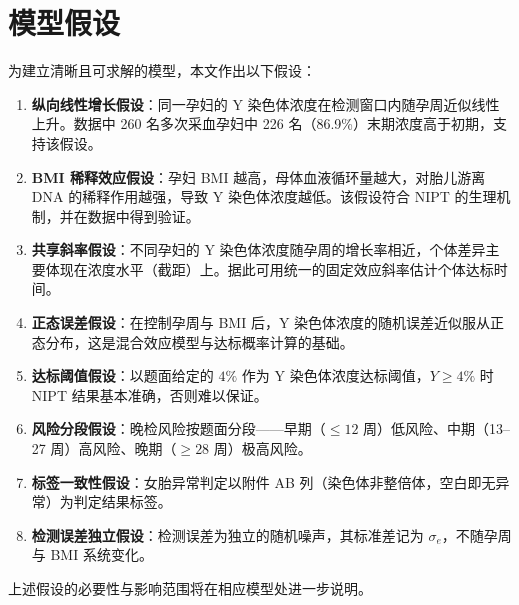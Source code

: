 \section{模型假设}

为建立清晰且可求解的模型，本文作出以下假设：

\begin{enumerate}
  \item \textbf{纵向线性增长假设}：同一孕妇的 Y 染色体浓度在检测窗口内随孕周近似线性上升。数据中 260 名多次采血孕妇中 226 名（86.9\%）末期浓度高于初期，支持该假设。
  \item \textbf{BMI 稀释效应假设}：孕妇 BMI 越高，母体血液循环量越大，对胎儿游离 DNA 的稀释作用越强，导致 Y 染色体浓度越低。该假设符合 NIPT 的生理机制，并在数据中得到验证。
  \item \textbf{共享斜率假设}：不同孕妇的 Y 染色体浓度随孕周的增长率相近，个体差异主要体现在浓度水平（截距）上。据此可用统一的固定效应斜率估计个体达标时间。
  \item \textbf{正态误差假设}：在控制孕周与 BMI 后，Y 染色体浓度的随机误差近似服从正态分布，这是混合效应模型与达标概率计算的基础。
  \item \textbf{达标阈值假设}：以题面给定的 $4\%$ 作为 Y 染色体浓度达标阈值，$Y\ge 4\%$ 时 NIPT 结果基本准确，否则难以保证。
  \item \textbf{风险分段假设}：晚检风险按题面分段——早期（$\le 12$ 周）低风险、中期（13--27 周）高风险、晚期（$\ge 28$ 周）极高风险。
  \item \textbf{标签一致性假设}：女胎异常判定以附件 AB 列（染色体非整倍体，空白即无异常）为判定结果标签。
  \item \textbf{检测误差独立假设}：检测误差为独立的随机噪声，其标准差记为 $\sigma_e$，不随孕周与 BMI 系统变化。
\end{enumerate}

上述假设的必要性与影响范围将在相应模型处进一步说明。
